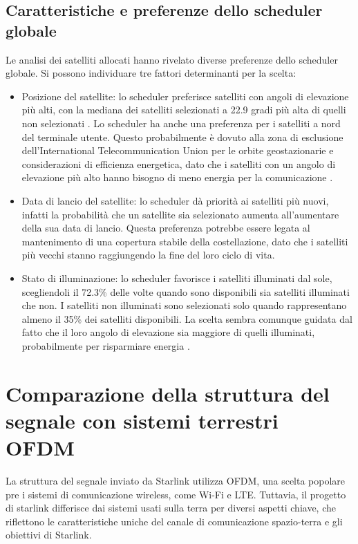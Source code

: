 \subsection{Caratteristiche e preferenze dello scheduler globale}
Le analisi dei satelliti allocati hanno rivelato diverse preferenze dello scheduler globale. Si possono individuare tre fattori determinanti per la scelta:
\begin{itemize}
  \item Posizione del satellite: lo scheduler preferisce satelliti con angoli di elevazione più alti, con la mediana dei satelliti selezionati a 22.9 gradi più alta di quelli non selezionati \cite{tanveer_making_2023}.
  Lo scheduler ha anche una preferenza per i satelliti a nord del terminale utente. Questo probabilmente è dovuto alla zona di esclusione dell'International Telecommunication Union per le orbite geostazionarie e considerazioni di efficienza energetica, dato che i satelliti con un angolo di elevazione più alto hanno bisogno di meno energia per la comunicazione \cite{tanveer_making_2023}.
  \item Data di lancio del satellite: lo scheduler dà priorità ai satelliti più nuovi, infatti la probabilità che un satellite sia selezionato aumenta all'aumentare della sua data di lancio. Questa preferenza potrebbe essere legata al mantenimento di una copertura stabile della costellazione, dato che i satelliti più vecchi stanno raggiungendo la fine del loro ciclo di vita.
  \item Stato di illuminazione: lo scheduler favorisce i satelliti illuminati dal sole, scegliendoli il 72.3\% delle volte quando sono disponibili sia satelliti illuminati che non. I satelliti non illuminati sono selezionati solo quando rappresentano almeno il 35\% dei satelliti disponibili. La scelta sembra comunque guidata dal fatto che il loro angolo di elevazione sia maggiore di quelli illuminati, probabilmente per risparmiare energia \cite{tanveer_making_2023}.
\end{itemize}

\section{Comparazione della struttura del segnale con sistemi terrestri OFDM}
La struttura del segnale inviato da Starlink utilizza \ac{OFDM}, una scelta popolare pre i sistemi di comunicazione wireless, come Wi-Fi e LTE.
Tuttavia, il progetto di starlink differisce dai sistemi usati sulla terra per diversi aspetti chiave, che riflettono le caratteristiche uniche del canale di comunicazione spazio-terra e gli obiettivi di Starlink.

